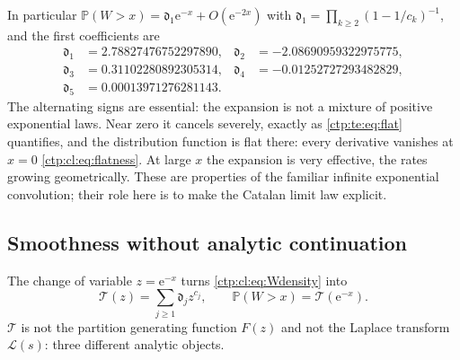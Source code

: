 \documentclass[11pt,a4paper]{article}
\numberwithin{equation}{section}
\theoremstyle{definition}
\theoremstyle{remark}
\newcommand{\e}{\mathrm e}
\newcommand{\PP}{\mathbb P}
\newcommand{\LW}{\mathcal L}
\newcommand{\sd}{\mathfrak d}
\begin{document}
In particular $\PP(W>x)=\sd_1\e^{-x}+O(\e^{-2x})$ with
$\sd_1=\prod_{k\ge2}(1-1/c_k)^{-1}$, and the first coefficients are
\begin{align*}
 \sd_1&=2.78827476752297890, &\sd_2&=-2.08690959322975775,\\
 \sd_3&=0.31102280892305314, &\sd_4&=-0.01252727293482829,\\
 \sd_5&=0.00013971276281143.
\end{align*}
The alternating signs are essential: the expansion is not a mixture of
positive exponential laws. Near zero it cancels severely, exactly as
\eqref{ctp:te:eq:flat} quantifies, and the distribution function is flat
there: every derivative vanishes at $x=0$ \eqref{ctp:cl:eq:flatness}. At
large $x$ the expansion is very effective, the rates growing geometrically.
These are properties of the familiar infinite exponential convolution;
their role here is to make the Catalan limit law explicit.

\subsection{Smoothness without analytic continuation}
The change of variable $z=\e^{-x}$ turns \eqref{ctp:cl:eq:Wdensity} into
\begin{equation}\label{ctp:te:eq:T}
 \mathcal T(z)=\sum_{j\ge1}\sd_jz^{c_j},\qquad\PP(W>x)=\mathcal T(\e^{-x}).
\end{equation}
$\mathcal T$ is not the partition generating function $F(z)$ and not the
Laplace transform $\LW(s)$: three different analytic objects.
\end{document}
